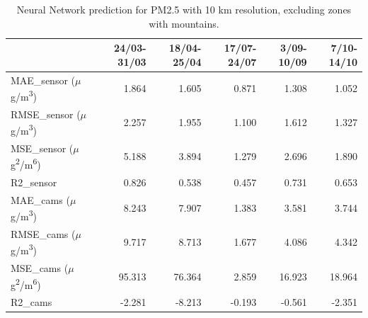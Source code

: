 \begin{table}[H]
\begin{tabular}{lrrrrr}
\toprule
 &  24/03-31/03 &  18/04-25/04 &  17/07-24/07 &  3/09-10/09 &  7/10-14/10 \\
\midrule
 MAE\_sensor ($\mu$g/m\textsuperscript{3})&        1.864 &        1.605 &        0.871 &       1.308 &       1.052 \\
RMSE\_sensor ($\mu$g/m\textsuperscript{3})&        2.257 &        1.955 &        1.100 &       1.612 &       1.327 \\
 MSE\_sensor ($\mu$g\textsuperscript{2}/m\textsuperscript{6})&        5.188 &        3.894 &        1.279 &       2.696 &       1.890 \\
  R2\_sensor &        0.826 &        0.538 &        0.457 &       0.731 &       0.653 \\
   MAE\_cams ($\mu$g/m\textsuperscript{3})&        8.243 &        7.907 &        1.383 &       3.581 &       3.744 \\
  RMSE\_cams ($\mu$g/m\textsuperscript{3})&        9.717 &        8.713 &        1.677 &       4.086 &       4.342 \\
   MSE\_cams ($\mu$g\textsuperscript{2}/m\textsuperscript{6})&       95.313 &       76.364 &        2.859 &      16.923 &      18.964 \\
    R2\_cams &       -2.281 &       -8.213 &       -0.193 &      -0.561 &      -2.351 \\
\bottomrule
\end{tabular}
\caption{Neural Network prediction for PM2.5 with 10 km resolution, excluding zones with mountains.}
\end{table}
